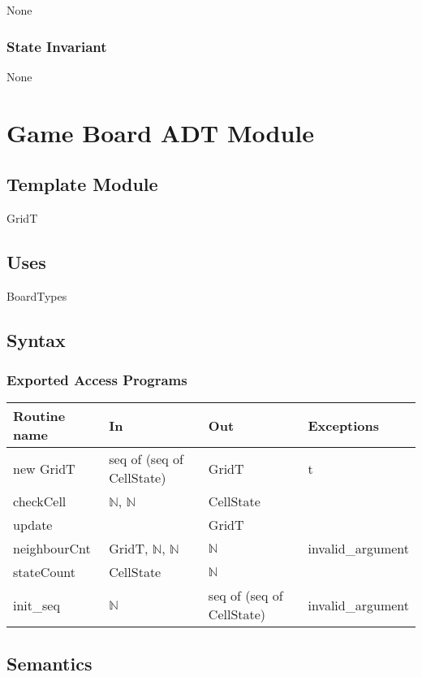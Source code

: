 \documentclass[12pt]{article}
\begin{document}
None

\subsubsection* {State Invariant}

None

\newpage

\section* {Game Board ADT Module}

\subsection*{Template Module}

GridT

\subsection* {Uses}

\noindent BoardTypes\\

\subsection* {Syntax}

\subsubsection* {Exported Access Programs}

\begin{tabular}{| l | l | l | l |}
\hline
\textbf{Routine name} & \textbf{In} & \textbf{Out} & \textbf{Exceptions}\\
\hline
new GridT  & seq of (seq of CellState) & GridT & t\\
\hline
checkCell & $\mathbb{N}$, $\mathbb{N}$ & CellState & \\
\hline
update & & GridT & \\
\hline
neighbourCnt & GridT, $\mathbb{N}$, $\mathbb{N}$ & $\mathbb{N}$ & invalid\_argument\\
\hline
stateCount & CellState & $\mathbb{N}$ & \\
\hline
init\_seq & $\mathbb{N}$ & seq of (seq of CellState) & invalid\_argument \\
\hline
\end{tabular}

\subsection* {Semantics}
\end{document}
